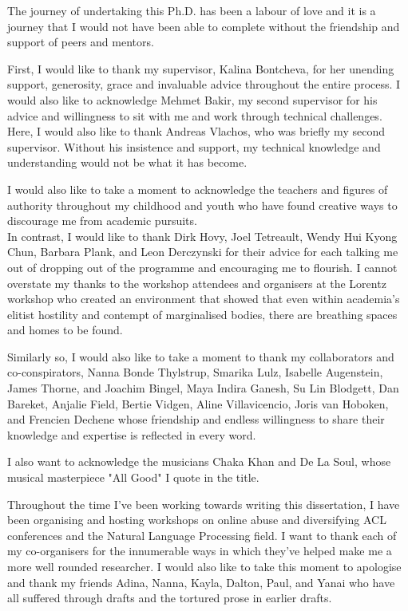 
\begin{acknowledgements}      

The journey of undertaking this Ph.D. has been a labour of love and it is a journey that I would not have been able to complete without the friendship and support of peers and mentors.

First, I would like to thank my supervisor, Kalina Bontcheva, for her unending support, generosity, grace and invaluable advice throughout the entire process.
I would also like to acknowledge Mehmet Bakir, my second supervisor for his advice and willingness to sit with me and work through technical challenges.
Here, I would also like to thank Andreas Vlachos, who was briefly my second supervisor. 
Without his insistence and support, my technical knowledge and understanding would not be what it has become.

I would also like to take a moment to acknowledge the teachers and figures of authority throughout my childhood and youth who have found creative ways to discourage me from academic pursuits.\\
In contrast, I would like to thank Dirk Hovy, Joel Tetreault, Wendy Hui Kyong Chun, Barbara Plank, and Leon Derczynski for their advice for each talking me out of dropping out of the programme and encouraging me to flourish.
I cannot overstate my thanks to the workshop attendees and organisers at the Lorentz workshop who created an environment that showed that even within academia's elitist hostility and contempt of marginalised bodies, there are breathing spaces and homes to be found.

Similarly so, I would also like to take a moment to thank my collaborators and co-conspirators, Nanna Bonde Thylstrup, Smarika Lulz, Isabelle Augenstein, James Thorne, and Joachim Bingel, Maya Indira Ganesh, Su Lin Blodgett, Dan Bareket, Anjalie Field, Bertie Vidgen, Aline Villavicencio, Joris van Hoboken, and Frencien Dechene whose friendship and endless willingness to share their knowledge and expertise is reflected in every word.

I also want to acknowledge the musicians Chaka Khan and De La Soul, whose musical masterpiece "All Good" I quote in the title.

Throughout the time I've been working towards writing this dissertation, I have been organising and hosting workshops on online abuse and diversifying ACL conferences and the Natural Language Processing field.
I want to thank each of my co-organisers for the innumerable ways in which they've helped make me a more well rounded researcher.
I would also like to take this moment to apologise and thank my friends Adina, Nanna, Kayla, Dalton, Paul, and Yanai who have all suffered through drafts and the tortured prose in earlier drafts.


\end{acknowledgements}
